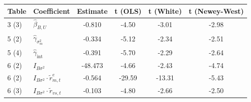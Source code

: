 \begin{tabular}{llcccc}
\toprule
Table & Coefficient & Estimate & t (OLS) & t (White) & t (Newey-West) \\
\midrule
3 (3) & $\hat\beta_{B,U}$ & -0.810 & -4.50 & -3.01 & -2.98 \\
5 (2) & $\hat\gamma_{\sigma^2_m}$ & -0.334 & -5.12 & -2.34 & -2.51 \\
5 (4) & $\hat\gamma_{\text{int}}$ & -0.391 & -5.70 & -2.29 & -2.64 \\
6 (2) & $I_{B\sigma^2}$ & -48.473 & -4.66 & -2.43 & -4.74 \\
6 (2) & $I_{B\sigma^2}\cdot \tilde r^e_{m,t}$ & -0.564 & -29.59 & -13.31 & -5.43 \\
6 (3) & $I_{B\sigma^2}\cdot \tilde r_{vs,t}$ & -0.103 & -4.80 & -2.66 & -2.50 \\
\bottomrule
\end{tabular}

